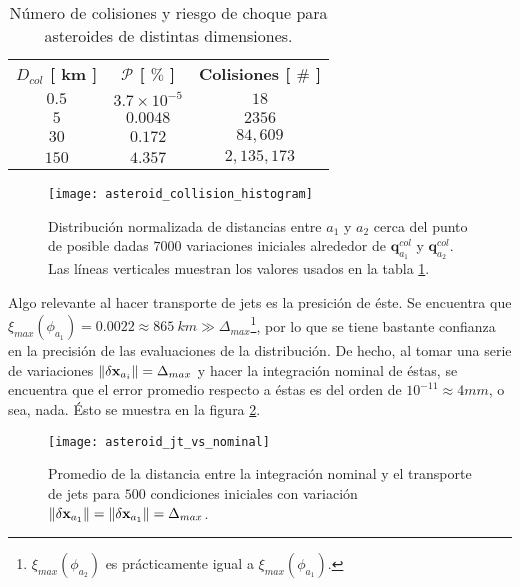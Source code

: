 \begin{table}[h!]
\centering
\begin{tabular}{c|c|c}
\toprule
\textbf{$ D_{col}$ [ km ]} & \textbf{$\mathcal{P}$ [ $\%$ ]} & \textbf{Colisiones [ $ \# $ ]} \\ \cmidrule(l){1-3} 
\textbf{$0.5$} &   $3.7 \times 10^{-5}$   & $18$          \\
\textbf{$5$}   &   $0.0048$               & $2356$        \\
\textbf{$30$}  &   $0.172$                & $84,609$     \\
\textbf{$150$} &   $4.357$                & $2,135,173$   \\ \bottomrule 
\end{tabular}
\caption{Número de colisiones y riesgo de choque para asteroides de distintas dimensiones.}
\label{table:collision_table}
\end{table}

\begin{figure}
 \centering
 \texttt{[image: asteroid\_collision\_histogram]}
 \caption{Distribución normalizada de distancias entre $a_1$ y $a_2$ cerca del punto de posible dadas $7000$ variaciones iniciales alrededor de $\mathbf{q}_{a_1}^{col}$ y $\mathbf{q}_{a_2}^{col}$. Las líneas verticales muestran los valores usados en la tabla \ref{table:collision_table}.}
 \label{fig:asteroid_collision_histogram}
\end{figure}


Algo relevante al hacer transporte de jets es la presición de éste. Se encuentra que $\xi_{max}(\phi_{a_1}) = 0.0022 \approx 865 \ km \gg \Delta_{max}$\footnote{$\xi_{max}(\phi_{a_2})$ es prácticamente igual a $\xi_{max}(\phi_{a_1})$.}, por lo que se tiene bastante confianza en la precisión de las evaluaciones de la distribución. De hecho, al tomar una serie de variaciones $\left\lVert\delta\mathbf{x}_{a_i}\right\rVert = \Delta_{max}$ y hacer la integración nominal de éstas, se encuentra que el error promedio respecto a éstas es del orden de $10^{-11} \approx 4 mm$, o sea, nada. Ésto se muestra en la figura \ref{fig:asteroid_jt_vs_nominal}.

\begin{figure}
 \centering
 \texttt{[image: asteroid\_jt\_vs\_nominal]}
 \caption{Promedio de la distancia entre la integración nominal y el transporte de jets para $500$ condiciones iniciales con variación $\left\lVert\delta\mathbf{x}_{a_1}\right\rVert = \left\lVert\delta\mathbf{x}_{a_1}\right\rVert = \Delta_{max}$.}
 \label{fig:asteroid_jt_vs_nominal}
\end{figure}

